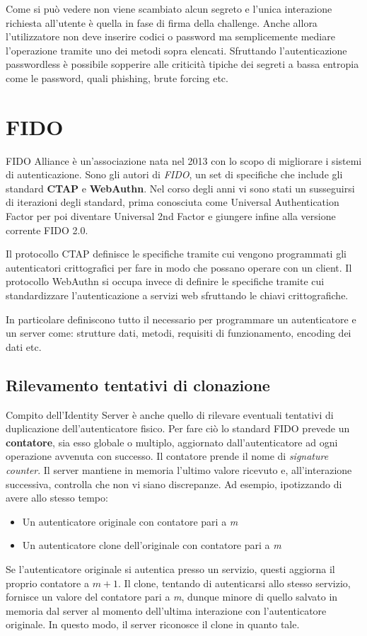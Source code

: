 Come si può vedere non viene scambiato alcun segreto e l'unica interazione richiesta all'utente è quella in fase di firma della challenge. Anche allora l'utilizzatore non deve inserire codici o password ma semplicemente mediare l'operazione tramite uno dei metodi sopra elencati. Sfruttando l'autenticazione passwordless è possibile sopperire alle criticità tipiche dei segreti a bassa entropia come le password, quali phishing, brute forcing etc. 

\section{FIDO}
\label{fido}

FIDO Alliance è un'associazione nata nel 2013 con lo scopo di migliorare i sistemi di autenticazione. Sono gli autori di \emph{FIDO}, un set di specifiche che include gli standard \textbf{CTAP} e \textbf{WebAuthn}. Nel corso degli anni vi sono stati un susseguirsi di iterazioni degli standard, prima conosciuta come Universal Authentication Factor per poi diventare Universal 2nd Factor e giungere infine alla versione corrente FIDO 2.0. 

Il protocollo CTAP definisce le specifiche tramite cui vengono programmati gli autenticatori crittografici per fare in modo che possano operare con un client. Il protocollo WebAuthn si occupa invece di definire le specifiche tramite cui standardizzare l'autenticazione a servizi web sfruttando le chiavi crittografiche. 

In particolare definiscono tutto il necessario per programmare un autenticatore e un server come: strutture dati, metodi, requisiti di funzionamento, encoding dei dati etc.

\subsection{Rilevamento tentativi di clonazione}
\label{fido:clonazione}

Compito dell'Identity Server è anche quello di rilevare eventuali tentativi di duplicazione dell'autenticatore fisico. Per fare ciò lo standard FIDO prevede un \textbf{contatore}, sia esso globale o multiplo, aggiornato dall'autenticatore ad ogni operazione avvenuta con successo. Il contatore prende il nome di \emph{signature counter}. Il server mantiene in memoria l'ultimo valore ricevuto e, all'interazione successiva, controlla che non vi siano discrepanze. Ad esempio, ipotizzando di avere allo stesso tempo:
\begin{itemize}
	\item Un autenticatore originale con contatore pari a \emph{m}
	\item Un autenticatore clone dell'originale con contatore pari a \emph{m}
\end{itemize}
Se l'autenticatore originale si autentica presso un servizio, questi aggiorna il proprio contatore a ${m+1}$. Il clone, tentando di autenticarsi allo stesso servizio, fornisce un valore del contatore pari a \emph{m}, dunque minore di quello salvato in memoria dal server al momento dell'ultima interazione con l'autenticatore originale. In questo modo, il server riconosce il clone in quanto tale. 

